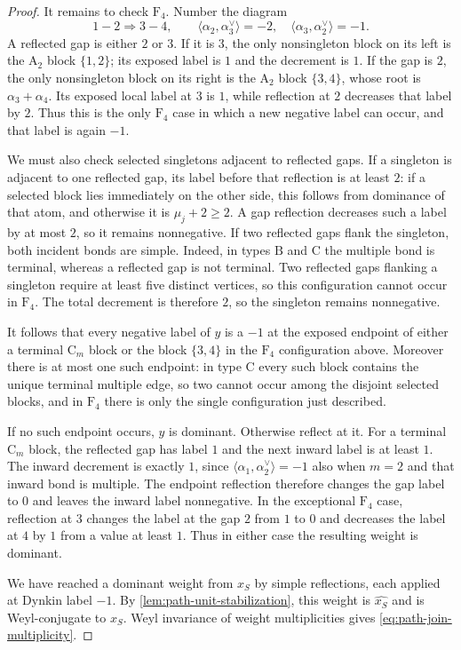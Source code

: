 \documentclass[11pt]{article}
\theoremstyle{definition}
\theoremstyle{remark}
\newcommand{\typeA}{\ensuremath{\mathrm{A}}}
\newcommand{\typeB}{\ensuremath{\mathrm{B}}}
\newcommand{\typeC}{\ensuremath{\mathrm{C}}}
\newcommand{\typeF}{\ensuremath{\mathrm{F}}}
\begin{document}
\begin{proof}
It remains to check $\typeF_4$.  Number the diagram
\[
        1-2\Rightarrow3-4,
        \qquad
        \langle\alpha_2,\alpha_3^\vee\rangle=-2,\quad
        \langle\alpha_3,\alpha_2^\vee\rangle=-1.
\]
A reflected gap is either $2$ or $3$.  If it is $3$, the only nonsingleton
block on its left is the $\typeA_2$ block $\{1,2\}$; its exposed label is $1$ and
the decrement is $1$.  If the gap is $2$, the only nonsingleton block on its
right is the $\typeA_2$ block $\{3,4\}$, whose root is $\alpha_3+\alpha_4$.
Its exposed local label at $3$ is $1$, while reflection at $2$ decreases that
label by $2$.  Thus this is the only $\typeF_4$ case in which a new negative
label can occur, and that label is again $-1$.

We must also check selected singletons adjacent to reflected gaps.  If a
singleton is adjacent to one reflected gap, its label before that reflection
is at least $2$: if a selected block lies immediately on the other side, this
follows from dominance of that atom, and otherwise it is $\mu_j+2\ge2$.
A gap reflection decreases such a label by at most $2$, so it remains
nonnegative.  If two reflected gaps flank the singleton, both incident bonds
are simple.  Indeed, in types $\typeB$ and $\typeC$ the multiple bond is
terminal, whereas a reflected gap is not terminal.  Two reflected gaps
flanking a singleton require at least five distinct vertices, so this
configuration cannot occur in $\typeF_4$.  The total decrement is therefore
$2$, so the singleton remains
nonnegative.

It follows that every negative label of $y$ is a $-1$ at the exposed endpoint
of either a terminal $\typeC_m$ block or the block $\{3,4\}$ in the
$\typeF_4$ configuration above.  Moreover there is at most one such endpoint:
in type $\typeC$ every such block contains the unique terminal multiple edge,
so two cannot occur among the disjoint selected blocks, and in $\typeF_4$
there is only the single configuration just described.

If no such endpoint occurs, $y$ is dominant.  Otherwise reflect at it.  For a
terminal $\typeC_m$ block, the reflected gap has label $1$ and the next inward
label is at least $1$.  The inward decrement is exactly $1$, since
$\langle\alpha_1,\alpha_2^\vee\rangle=-1$ also when $m=2$ and that inward
bond is multiple.  The endpoint reflection therefore changes the gap label
to $0$ and leaves the inward label nonnegative.  In the exceptional $\typeF_4$ case,
reflection at $3$ changes the label at the gap $2$ from $1$ to $0$ and
decreases the label at $4$ by $1$ from a value at least $1$.  Thus in either
case the resulting weight is dominant.

We have reached a dominant weight from $x_S$ by simple reflections, each
applied at Dynkin label $-1$.  By \cref{lem:path-unit-stabilization}, this
weight is $\widehat{x_S}$ and is Weyl-conjugate to $x_S$.  Weyl invariance of
weight multiplicities gives \eqref{eq:path-join-multiplicity}.
\end{proof}
\end{document}
